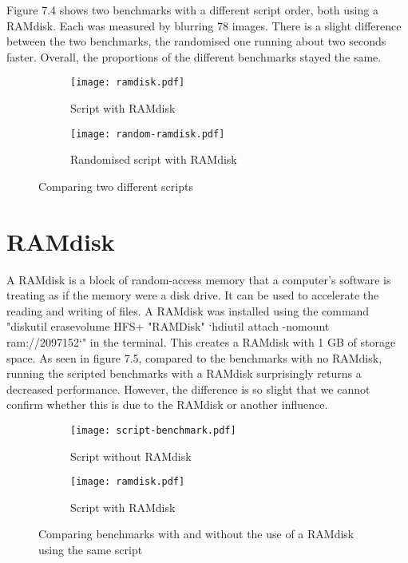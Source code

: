 Figure 7.4 shows two benchmarks with a different script order, both using a RAMdisk. Each was measured by blurring 78 images. There is a slight difference between the two benchmarks, the randomised one running about two seconds faster. Overall, the proportions of the different benchmarks stayed the same.

\begin{figure}[H]
	\centering
	\begin{subfigure}{.5\textwidth}
	  \centering
	  \texttt{[image: ramdisk.pdf]}
	  \caption{Script with RAMdisk}
	  \label{fig:ramdisk}
	\end{subfigure}%
	\begin{subfigure}{.5\textwidth}
	  \centering
	  \texttt{[image: random-ramdisk.pdf]}
	  \caption{Randomised script with RAMdisk}
	  \label{fig:random-ramdisk}
	\end{subfigure}
	\caption{Comparing two different scripts}
	\label{fig:two-scripts}
\end{figure}

\section{RAMdisk}
A RAMdisk is a block of random-access memory that a computer's software is treating as if the memory were a disk drive. It can be used to accelerate the reading and writing of files. A RAMdisk was installed using the command "diskutil erasevolume HFS+ "RAMDisk" `hdiutil attach -nomount ram://2097152`" in the terminal. This creates a RAMdisk with 1 GB of storage space.
As seen in figure 7.5, compared to the benchmarks with no RAMdisk, running the scripted benchmarks with a RAMdisk surprisingly returns a decreased performance. However, the difference is so slight that we cannot confirm whether this is due to the RAMdisk or another influence.

\begin{figure}[H]
	\centering
	\begin{subfigure}{.5\textwidth}
	  \centering
	  \texttt{[image: script-benchmark.pdf]}
	  \caption{Script without RAMdisk}
	  \label{fig:script2}
	\end{subfigure}%
	\begin{subfigure}{.5\textwidth}
	  \centering
	  \texttt{[image: ramdisk.pdf]}
	  \caption{Script with RAMdisk}
	  \label{fig:ramdisk2}
	\end{subfigure}
	\caption{Comparing benchmarks with and without the use of a RAMdisk using the same script}
	\label{fig:ramdisk-vs-noramdisk}
\end{figure}

